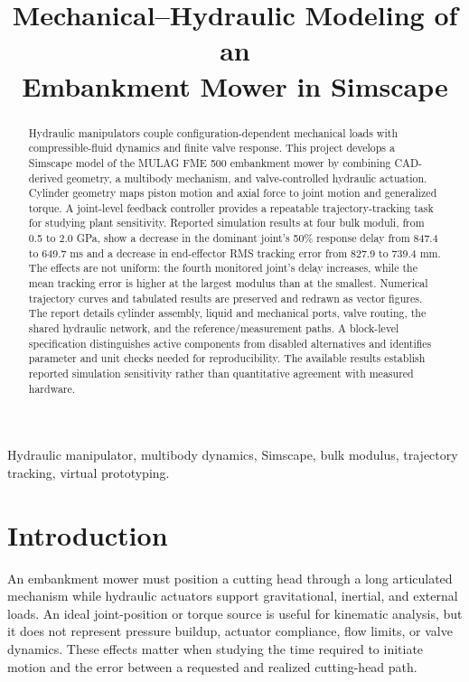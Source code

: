 \documentclass[conference,letterpaper]{IEEEtran}
\title{Mechanical--Hydraulic Modeling of an\\Embankment Mower in Simscape}
\author{\IEEEauthorblockN{Kevin Kudakwashe Murera}
\IEEEauthorblockA{Robotics Research Lab, Department of Computer Science\\
RPTU Kaiserslautern-Landau\\Kaiserslautern, Germany}}
\begin{document}
\maketitle
\begin{abstract}
Hydraulic manipulators couple configuration-dependent mechanical loads with compressible-fluid dynamics and finite valve response. This project develops a Simscape model of the MULAG FME 500 embankment mower by combining CAD-derived geometry, a multibody mechanism, and valve-controlled hydraulic actuation. Cylinder geometry maps piston motion and axial force to joint motion and generalized torque. A joint-level feedback controller provides a repeatable trajectory-tracking task for studying plant sensitivity. Reported simulation results at four bulk moduli, from 0.5 to 2.0 GPa, show a decrease in the dominant joint's 50\% response delay from 847.4 to 649.7 ms and a decrease in end-effector RMS tracking error from 827.9 to 739.4 mm. The effects are not uniform: the fourth monitored joint's delay increases, while the mean tracking error is higher at the largest modulus than at the smallest. Numerical trajectory curves and tabulated results are preserved and redrawn as vector figures. The report details cylinder assembly, liquid and mechanical ports, valve routing, the shared hydraulic network, and the reference/measurement paths. A block-level specification distinguishes active components from disabled alternatives and identifies parameter and unit checks needed for reproducibility. The available results establish reported simulation sensitivity rather than quantitative agreement with measured hardware.
\end{abstract}
\begin{IEEEkeywords}
Hydraulic manipulator, multibody dynamics, Simscape, bulk modulus, trajectory tracking, virtual prototyping.
\end{IEEEkeywords}

\section{Introduction}
An embankment mower must position a cutting head through a long articulated mechanism while hydraulic actuators support gravitational, inertial, and external loads. An ideal joint-position or torque source is useful for kinematic analysis, but it does not represent pressure buildup, actuator compliance, flow limits, or valve dynamics. These effects matter when studying the time required to initiate motion and the error between a requested and realized cutting-head path.
\end{document}
